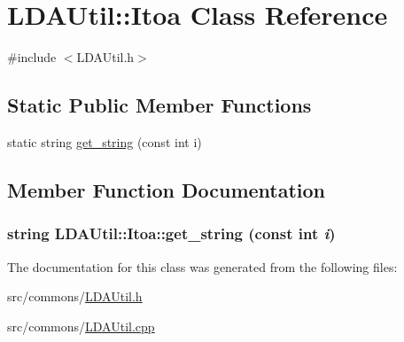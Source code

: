 \hypertarget{class_l_d_a_util_1_1_itoa}{
\section{LDAUtil::Itoa Class Reference}
\label{class_l_d_a_util_1_1_itoa}
}


{\ttfamily \#include $<$LDAUtil.h$>$}

\subsection*{Static Public Member Functions}
\begin{DoxyCompactItemize}
\item 
static string \hyperlink{class_l_d_a_util_1_1_itoa_ad58b84775f7d68c56065c51910f6058b}{get\_\-string} (const int i)
\end{DoxyCompactItemize}


\subsection{Member Function Documentation}
\hypertarget{class_l_d_a_util_1_1_itoa_ad58b84775f7d68c56065c51910f6058b}{
\subsubsection[{get\_\-string}]{\setlength{\rightskip}{0pt plus 5cm}string LDAUtil::Itoa::get\_\-string (const int {\em i})}}
\label{class_l_d_a_util_1_1_itoa_ad58b84775f7d68c56065c51910f6058b}


The documentation for this class was generated from the following files:\begin{DoxyCompactItemize}
\item 
src/commons/\hyperlink{_l_d_a_util_8h}{LDAUtil.h}\item 
src/commons/\hyperlink{_l_d_a_util_8cpp}{LDAUtil.cpp}\end{DoxyCompactItemize}
